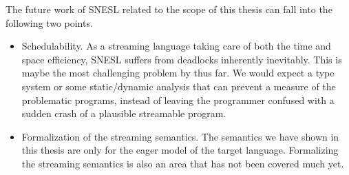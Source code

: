 The future work of SNESL related to the scope of this thesis can fall into the following two points.
\begin{itemize}
	\item Schedulability.  As a streaming language taking care of both the time and space efficiency,  SNESL suffers from deadlocks inherently inevitably. This is maybe the most challenging problem by thus far. We would expect a type system or some static/dynamic analysis that can prevent a measure of the problematic programs, instead of leaving the programmer confused with a sudden crash of a plausible streamable program.
	
	\item Formalization of the streaming semantics. The semantics we have shown in this thesis are only for the eager model of the target language. Formalizing the streaming semantics is also an area that has not been covered much yet.
\end{itemize}

